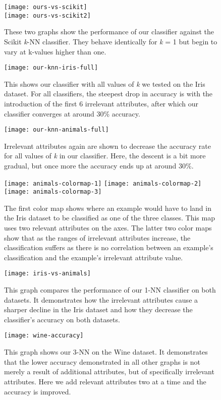 \documentclass{article}
\begin{document}

 

\begin{figure}[hbt]
\centering
\texttt{[image: ours-vs-scikit]} \\
\texttt{[image: ours-vs-scikit2]} 
\caption{These two graphs show the performance of our classifier against the Scikit \textit{k}-NN classifier. They behave identically for \textit{k} = 1 but begin to vary at k-values higher than one.}
\end{figure}

\begin{figure}[hbt]
\centering
\texttt{[image: our-knn-iris-full]} 
\caption{This shows our classifier with all values of \textit{k} we tested on the Iris dataset. For all classifiers, the steepest drop in accuracy is with the introduction of the first 6 irrelevant attributes, after which our classifier converges at around 30\% accuracy.}
\end{figure}

\begin{figure}[hbt]
\centering
\texttt{[image: our-knn-animals-full]} 
\caption{Irrelevant attributes again are shown to decrease the accuracy rate for all values of \textit{k} in our classifier. Here, the descent is a bit more gradual, but once more the accuracy ends up at around 30\%.}
\end{figure}

\begin{figure}[hbt]
\centering
\texttt{[image: animals-colormap-1]} 
\texttt{[image: animals-colormap-2]}
\texttt{[image: animals-colormap-3]}  
\caption{The first color map shows where an example would have to land in the Iris dataset to be classified as one of the three classes. This map uses two relevant attributes on the axes. The latter two color maps show that as the ranges of irrelevant attributes increase, the classification suffers as there is no correlation between an example's classification and the example's irrelevant attribute value.}
\end{figure}

\begin{figure}[hbt]
\centering
\texttt{[image: iris-vs-animals]} 
\caption{This graph compares the performance of our 1-NN classifier on both datasets. It demonstrates how the irrelevant attributes cause a sharper decline in the Iris dataset and how they decrease the classifier’s accuracy on both datasets.}
\end{figure}

\begin{figure}[hbt]
\centering
\texttt{[image: wine-accuracy]} 
\caption{This graph shows our 3-NN on the Wine dataset. It demonstrates that the lower accuracy demonstrated in all other graphs is not merely a result of additional attributes, but of specifically irrelevant attributes. Here we add relevant attributes two at a time and the accuracy is improved.}
\end{figure}
\end{document}
